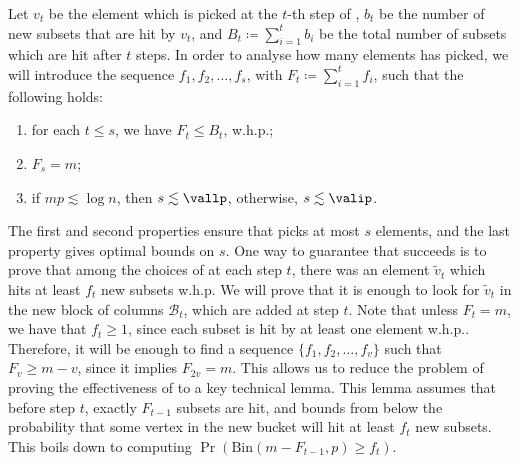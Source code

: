 Let \(v_t\) be the element which is picked at the \(t\)-th step of \bgreedy, 
\(b_t\) be the number of new subsets that are hit by \(v_t\),
and \(B_t \coloneqq \sum_{i = 1}^t b_i\) be the total number of subsets which are hit after \(t\) steps.
In order to analyse how many elements \bgreedy has picked, we will introduce the sequence 
\(f_1, f_2, \ldots, f_s\), with \(F_t \coloneqq \sum_{i = 1}^t f_i\), such that the following holds:
\begin{enumerate}
    \item for each \(t \leq s\), we have \(F_t \leq B_t\), w.h.p.;
    \item \(F_s = m\);
    \item if \(mp \lesssim \log n\), then \(s \lesssim \vallp\), otherwise, \(s \lesssim \valip\).
\end{enumerate}
The first and second properties ensure that \bgreedy picks at most \(s\) elements, 
and the last property gives optimal bounds on \(s\). 
One way to guarantee that \bgreedy succeeds is to prove that among the choices of \bgreedy at each step \(t\),
there was an element \(\tilde v_t\) which hits at least \(f_t\) new subsets w.h.p. We will prove that 
it is enough to look for \(\tilde v_t\) in 
the new block of columns \(\mathcal{B}_t\), which are added at step \(t\).
Note that unless \(F_t = m\), we have that \(f_t \geq 1\), 
since each subset is hit by at least one element w.h.p.. 
Therefore, it will be enough to find a sequence $\{f_1, f_2, \dots, f_{v}\}$ such that \(F_v \geq m - v\), since it implies \(F_{2v} = m\).
This allows us to reduce the problem of proving the effectiveness of \bgreedy to 
a key technical lemma. This lemma assumes that before step \(t\), exactly \(F_{t - 1}\)
subsets are hit, and bounds from below the probability that some vertex in the new bucket will hit at least \(f_t\) new subsets. 
This boils down to computing \(\Pr (\mathrm{Bin}(m - F_{t - 1}, p) \geq f_t)\).

